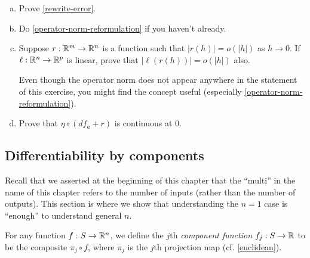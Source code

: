\begin{exercise} \label{chain-rule-details}
	\begin{enumerate}[(a)]
		\item Prove \cref{rewrite-error}. 
		
		\item Do \cref{operator-norm-reformulation} if you haven't already. 
		
		\item \label{linear-of-small-is-small} Suppose $r : \mathbb{R}^m \to \mathbb{R}^n$ is a function such that $|r(h)| = o(|h|)$ as $h \to 0$. If $\ell : \mathbb{R}^n \to \mathbb{R}^p$ is linear, prove that $|\ell(r(h))| = o(|h|)$ also.
		
		\begin{hint} Even though the operator norm does not appear anywhere in the statement of this exercise, you might find the concept useful (especially \cref{operator-norm-reformulation}). 
		\end{hint}
		
		\item Prove that $\eta \circ (df_a + r)$ is continuous at 0. 
	\end{enumerate}
\end{exercise}

\subsection{Differentiability by components}

Recall that we asserted at the beginning of this chapter that the ``multi'' in the name of this chapter refers to the number of inputs (rather than the number of outputs). This section is where we show that understanding the $n = 1$ case is ``enough'' to understand general $n$.

\begin{definition} 
	For any function $f : S \to \mathbb{R}^n$, we define the $j$th \emph{component function} $f_j : S \to \mathbb{R}$ to be the composite $\pi_j \circ f$, where $\pi_j$ is the $j$th projection map (cf. \cref{euclidean}).
\end{definition}

